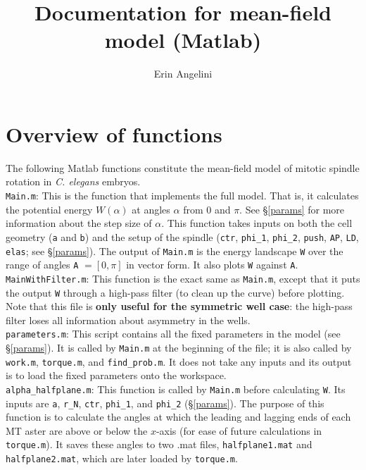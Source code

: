 \documentclass{article}
\author{Erin Angelini}
\title{Documentation for mean-field model (Matlab)}
\begin{document}
\maketitle

\section{Overview of functions}
The following Matlab functions constitute the mean-field model of mitotic spindle rotation in \emph{C. elegans} embryos. \\[3pt]

\noindent\texttt{Main.m}: This is the function that implements the full model. That is, it calculates the potential energy $W(\alpha)$ at angles $\alpha$ from 0 and $\pi$. See \S\ref{params} for more information about the step size of $\alpha$. This function takes inputs on both the cell geometry (\texttt{a} and \texttt{b}) and the setup of the spindle (\texttt{ctr}, \texttt{phi\_1}, \texttt{phi\_2}, \texttt{push}, \texttt{AP}, \texttt{LD}, \texttt{elas}; see \S\ref{params}). The output of \texttt{Main.m} is the energy landscape \texttt{W} over the range of angles \texttt{A} $=[0,\pi]$ in vector form. It also plots \texttt{W} against \texttt{A}. 
\\[3pt]

\noindent\texttt{MainWithFilter.m}: This function is the exact same as \texttt{Main.m}, except that it puts the output \texttt{W} through a high-pass filter (to clean up the curve) before plotting. Note that this file is \textbf{only useful for the symmetric well case}: the high-pass filter loses all information about asymmetry in the wells.
\\[3pt]

\noindent\texttt{parameters.m}: This script contains all the fixed parameters in the model (see \S\ref{params}). It is called by \texttt{Main.m} at the beginning of the file; it is also called by \texttt{work.m}, \texttt{torque.m}, and \texttt{find\_prob.m}. It does not take any inputs and its output is to load the fixed parameters onto the workspace.
\\[3pt]

\noindent\texttt{alpha\_halfplane.m}: This function is called by \texttt{Main.m} before calculating \texttt{W}. Its inputs are \texttt{a}, \texttt{r\_N}, \texttt{ctr}, \texttt{phi\_1}, and \texttt{phi\_2} (\S\ref{params}). The purpose of this function is to calculate the angles at which the leading and lagging ends of each MT aster are above or below the $x$-axis (for ease of future calculations in \texttt{torque.m}). It saves these angles to two .mat files, \texttt{halfplane1.mat} and \texttt{halfplane2.mat}, which are later loaded by \texttt{torque.m}.
\\[3pt]
\end{document}
